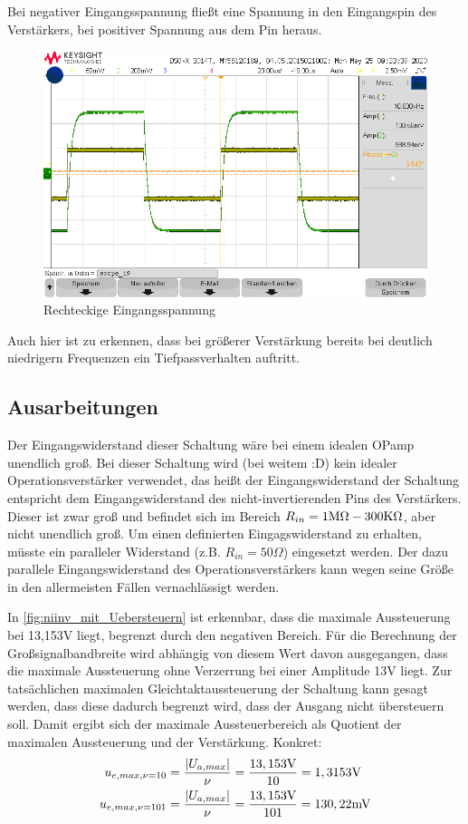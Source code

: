 Bei negativer Eingangsspannung fließt eine Spannung in den Eingangspin des Verstärkers, bei positiver Spannung aus dem Pin heraus. 
\begin{figure}[H]
    \centering
    \includegraphics[width=\costumPicWidth]{Lab_1/Messungen/niinv_verst/square.png}
    \caption{Rechteckige Eingangsspannung}
    \label{fig:niinv_rechteck}
\end{figure}
Auch hier ist zu erkennen, dass bei größerer Verstärkung bereits bei deutlich niedrigern Frequenzen ein Tiefpassverhalten auftritt.

\subsection{Ausarbeitungen}
Der Eingangswiderstand dieser Schaltung wäre bei einem idealen OPamp unendlich groß. Bei dieser Schaltung wird (bei weitem :D) kein idealer Operationsverstärker verwendet, das heißt der Eingangswiderstand der Schaltung entspricht dem Eingangswiderstand des nicht-invertierenden Pins des Verstärkers. Dieser ist zwar groß und befindet sich im Bereich $R_{in}=1\text{M}\Omega-300\text{K}\Omega$, aber nicht unendlich groß. Um einen definierten Eingagswiderstand zu erhalten, müsste ein paralleler Widerstand (z.B. $R_{in}=50\Omega$) eingesetzt werden. Der dazu parallele Eingangswiderstand des Operationsverstärkers kann wegen seine Größe in den allermeisten Fällen vernachlässigt werden.


In \autoref{fig:niinv_mit_Uebersteuern} ist erkennbar, dass die maximale Aussteuerung bei 13,153V liegt, begrenzt durch den negativen Bereich. Für die Berechnung der Großsignalbandbreite wird abhängig von diesem Wert davon ausgegangen, dass die maximale Aussteuerung ohne Verzerrung bei einer Amplitude 13V liegt. Zur tatsächlichen maximalen Gleichtaktaussteuerung der Schaltung kann gesagt werden, dass diese dadurch begrenzt wird, dass der Ausgang nicht übersteuern soll. Damit ergibt sich der maximale Aussteuerbereich als Quotient der maximalen Aussteuerung und der Verstärkung. Konkret:
\begin{align}
    u_{e,max,\nu=10}&=\frac{|U_{a,max}|}{\nu}=\frac{13,153\text{V}}{10}=1,3153\text{V} \\
    u_{e,max,\nu=101}&=\frac{|U_{a,max}|}{\nu}=\frac{13,153\text{V}}{101}=130,22\text{mV}
\end{align}


